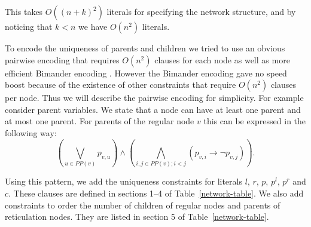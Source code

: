 \documentclass[runningheads, envcountsame, a4paper]{llncs}
\begin{document}
This takes $O((n + k)^2)$ literals for specifying the network structure, and by noticing that $k < n$ we have $O(n^2)$ literals.

To encode the uniqueness of parents and children we tried to use an obvious pairwise encoding that requires 
$O(n^2)$ clauses for each node as well as more efficient Bimander encoding \cite{nguyenefficient}. However the Bimander encoding gave no speed boost because of the existence of other constraints that require $O(n^2)$ clauses per node.
Thus we will describe the pairwise encoding for simplicity.
For example consider parent variables. We state that a node can have at least one parent and at most one parent. For parents of the regular node $v$ this can be expressed 
in the following way: 
$$\left(\bigvee\limits_{u \in PP(v)} p_{v,u}\right) \wedge \left(\bigwedge\limits_{i, j \in PP(v);i < j} \left(p_{v,i} \rightarrow \neg p_{v,j}\right)\right).$$

Using this pattern, we add the uniqueness constraints for literals $l$, $r$, $p$, $p^l$, $p^r$ and $c$. 
These clauses are defined in sections 1--4 of Table~\ref{network-table}. 
We also add constraints to order the number of children of regular nodes and parents of reticulation nodes.
They are listed in section 5 of Table~\ref{network-table}.
\end{document}
